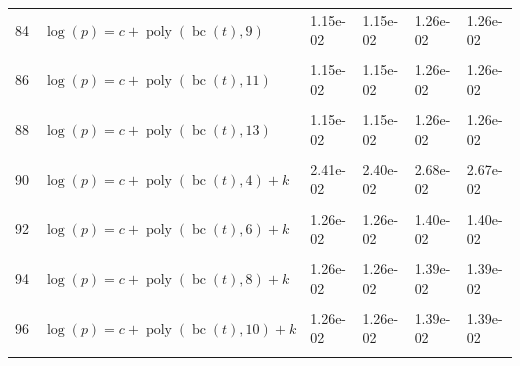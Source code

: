 \documentclass[12pt,a4paper]{article}
\DeclareMathOperator{\bc}{bc}
\DeclareMathOperator{\poly}{poly}
\begin{document}
\begin{longtable}[t]{ll>{\raggedleft\arraybackslash}p{2cm}>{\raggedleft\arraybackslash}p{2cm}>{\raggedleft\arraybackslash}p{2cm}>{\raggedleft\arraybackslash}p{2cm}}
84 & $\log(p) = c + \poly\left( \bc(t), 9 \right)$ & 1.15e-02 & 1.15e-02 & 1.26e-02 & 1.26e-02\\
\cellcolor{gray!6}{85} & \cellcolor{gray!6}{$\log(p) = c + \poly\left( \bc(t), 10 \right)$} & \cellcolor{gray!6}{1.15e-02} & \cellcolor{gray!6}{1.15e-02} & \cellcolor{gray!6}{1.26e-02} & \cellcolor{gray!6}{1.26e-02}\\
86 & $\log(p) = c + \poly\left( \bc(t), 11 \right)$ & 1.15e-02 & 1.15e-02 & 1.26e-02 & 1.26e-02\\
\cellcolor{gray!6}{87} & \cellcolor{gray!6}{$\log(p) = c + \poly\left( \bc(t), 12 \right)$} & \cellcolor{gray!6}{1.15e-02} & \cellcolor{gray!6}{1.15e-02} & \cellcolor{gray!6}{1.26e-02} & \cellcolor{gray!6}{1.26e-02}\\
88 & $\log(p) = c + \poly\left( \bc(t), 13 \right)$ & 1.15e-02 & 1.15e-02 & 1.26e-02 & 1.26e-02\\
\cellcolor{gray!6}{89} & \cellcolor{gray!6}{$\log(p) = c + \poly\left( \bc(t), 3 \right) + k$} & \cellcolor{gray!6}{3.63e-02} & \cellcolor{gray!6}{2.03e-02} & \cellcolor{gray!6}{4.04e-02} & \cellcolor{gray!6}{2.24e-02}\\
90 & $\log(p) = c + \poly\left( \bc(t), 4 \right) + k$ & 2.41e-02 & 2.40e-02 & 2.68e-02 & 2.67e-02\\
\cellcolor{gray!6}{91} & \cellcolor{gray!6}{$\log(p) = c + \poly\left( \bc(t), 5 \right) + k$} & \cellcolor{gray!6}{1.58e-02} & \cellcolor{gray!6}{1.38e-02} & \cellcolor{gray!6}{1.75e-02} & \cellcolor{gray!6}{1.53e-02}\\
92 & $\log(p) = c + \poly\left( \bc(t), 6 \right) + k$ & 1.26e-02 & 1.26e-02 & 1.40e-02 & 1.40e-02\\
\cellcolor{gray!6}{93} & \cellcolor{gray!6}{$\log(p) = c + \poly\left( \bc(t), 7 \right) + k$} & \cellcolor{gray!6}{1.28e-02} & \cellcolor{gray!6}{1.27e-02} & \cellcolor{gray!6}{1.41e-02} & \cellcolor{gray!6}{1.41e-02}\\
94 & $\log(p) = c + \poly\left( \bc(t), 8 \right) + k$ & 1.26e-02 & 1.26e-02 & 1.39e-02 & 1.39e-02\\
\cellcolor{gray!6}{95} & \cellcolor{gray!6}{$\log(p) = c + \poly\left( \bc(t), 9 \right) + k$} & \cellcolor{gray!6}{1.26e-02} & \cellcolor{gray!6}{1.26e-02} & \cellcolor{gray!6}{1.39e-02} & \cellcolor{gray!6}{1.39e-02}\\
96 & $\log(p) = c + \poly\left( \bc(t), 10 \right) + k$ & 1.26e-02 & 1.26e-02 & 1.39e-02 & 1.39e-02\\
\cellcolor{gray!6}{97} & \cellcolor{gray!6}{$\log(p) = c + \poly\left( \bc(t), 11 \right) + k$} & \cellcolor{gray!6}{1.26e-02} & \cellcolor{gray!6}{1.26e-02} & \cellcolor{gray!6}{1.39e-02} & \cellcolor{gray!6}{1.39e-02}\\

\end{longtable}
\end{document}
